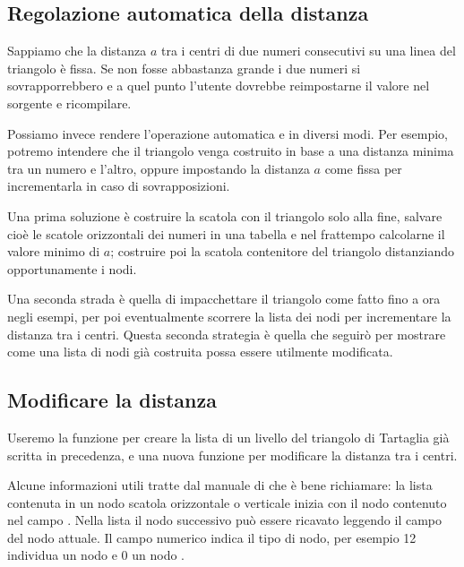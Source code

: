 \subsection{Regolazione automatica della distanza}

Sappiamo che la distanza \( a \) tra i centri di due numeri consecutivi su una
linea del triangolo è fissa. Se non fosse abbastanza grande i due numeri si
sovrapporrebbero e a quel punto l'utente dovrebbe reimpostarne il valore nel
sorgente e ricompilare.

Possiamo invece rendere l'operazione automatica e in diversi modi. Per esempio,
potremo intendere che il triangolo venga costruito in base a una distanza minima
tra un numero e l'altro, oppure impostando la distanza \( a \) come fissa per
incrementarla in caso di sovrapposizioni.

Una prima soluzione è costruire la scatola con il triangolo solo alla fine,
salvare cioè le scatole orizzontali dei numeri in una tabella e nel frattempo
calcolarne il valore minimo di \( a \); costruire poi la scatola contenitore del
triangolo distanziando opportunamente i nodi.

Una seconda strada è quella di impacchettare il triangolo come fatto fino a ora
negli esempi, per poi eventualmente scorrere la lista dei nodi per incrementare
la distanza tra i centri. Questa seconda strategia è quella che seguirò per
mostrare come una lista di nodi già costruita possa essere utilmente
modificata.




\subsection{Modificare la distanza}

Useremo la funzione  per creare la lista di un livello del
triangolo di Tartaglia già scritta in precedenza, e una nuova funzione
 per modificare la distanza tra i centri.

Alcune informazioni utili tratte dal manuale di \LuaTeX{} che è bene richiamare:
la lista contenuta in un nodo scatola orizzontale o verticale inizia con il nodo
contenuto nel campo . Nella lista il nodo successivo può essere
ricavato leggendo il campo  del nodo attuale. Il campo numerico
 indica il tipo di nodo, per esempio 12 individua un nodo  e
0 un nodo .

